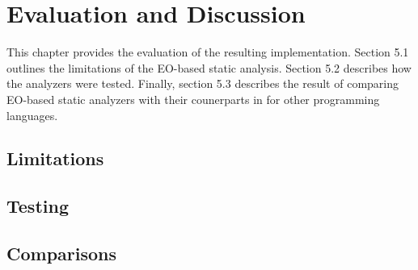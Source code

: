 \chapter{Evaluation and Discussion}
\label{chap:eval}
This chapter provides the evaluation of the resulting implementation. Section 5.1 outlines the limitations of the EO-based static analysis. Section 5.2 describes how the analyzers were tested. Finally, section 5.3 describes the result of comparing EO-based static analyzers with their counerparts in for other programming languages.

\section{Limitations}


\section{Testing}

\section{Comparisons}
